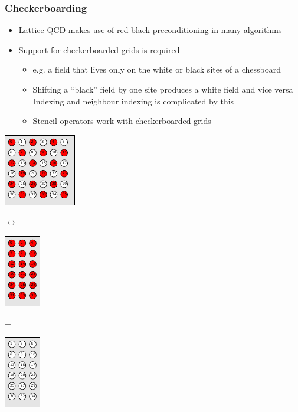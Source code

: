 \documentclass[pdf,ps,8pt]{beamer}
\begin{document}
\begin{frame}[fragile]\small\frametitle{Checkerboarding}

  \begin{itemize}
  \item Lattice  QCD makes use of red-black preconditioning in many algorithms
  \item Support for checkerboarded grids is required
  \begin{itemize}
  \item e.g. a field that lives only on the white or black sites of a chessboard
  \item Shifting a ``black'' field by one site produces a white field and vice versa\\ Indexing and neighbour indexing is complicated by this
  \item Stencil operators work with checkerboarded grids
  \end{itemize}
  \end{itemize}
\begin{center}
  \includegraphics[height=0.2\textheight]{cb.pdf}
  \begin{minipage}{0.1\textwidth}{\hspace{0.25\textwidth}$\longleftrightarrow$\vspace{0.15\textheight}}\end{minipage}
    \includegraphics[height=0.2\textheight]{cbeven.pdf}
  \begin{minipage}{0.06\textwidth}{\hspace{0.25\textwidth}$+$\vspace{0.15\textheight}}\end{minipage}
    \includegraphics[height=0.2\textheight]{cbodd.pdf}

\end{center}
\end{frame}
\end{document}
